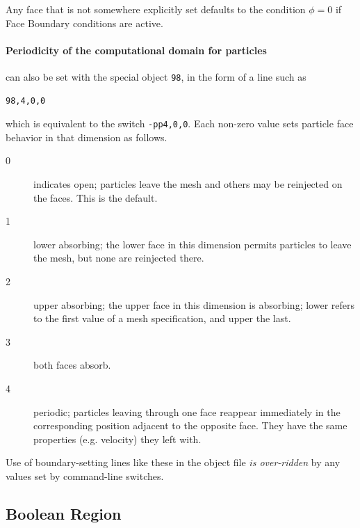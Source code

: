 \documentclass[12pt]{article}
\begin{document}
Any face that is not somewhere explicitly set defaults to the
condition $\phi=0$ if Face Boundary conditions are active.

\paragraph{Periodicity of the computational domain for
  particles}\label{partperiod} can
also be set with the special object \verb!98!, in the form of a line
such as
\begin{verbatim}
98,4,0,0
\end{verbatim} which is equivalent to the switch \verb!-pp4,0,0!.
Each non-zero value sets particle face behavior in that dimension as follows.

\begin{description}
\item[0]  indicates open; particles leave the mesh and others may be
reinjected on the faces. This is the default. 
\item[1] lower absorbing; the lower face in this dimension permits particles
to leave the mesh, but none are reinjected there.
\item[2] upper absorbing; the upper face in this dimension is absorbing;
lower refers to the first value of a mesh specification, and upper the
last.
\item[3] both faces absorb.
\item[4] periodic; particles leaving through one face reappear immediately in the
corresponding position adjacent to the opposite face. They have the same
properties (e.g. velocity) they left with.
\end{description}

Use of boundary-setting lines like these in the object file
\emph{is over-ridden} by any values set by command-line switches.



\subsection{Boolean Region}
\end{document}

